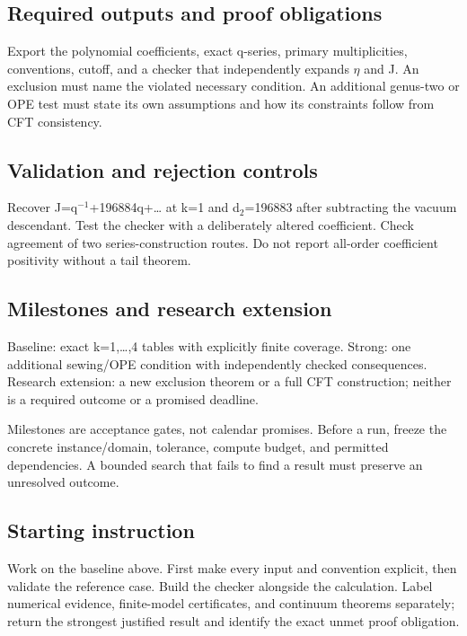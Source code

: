\documentclass[
  11pt,
]{article}
\begin{document}
\subsection{Required outputs and proof obligations}

Export the polynomial coefficients, exact q-series, primary
multiplicities, conventions, cutoff, and a checker that independently
expands \ensuremath{\eta} and J. An exclusion must name the violated
necessary condition. An additional genus-two or OPE test must state its
own assumptions and how its constraints follow from CFT consistency.

\subsection{Validation and rejection controls}

Recover J=q\ensuremath{{}^{-1}}+196884q+… at k=1 and
d\ensuremath{{}_{2}}=196883 after subtracting the vacuum descendant.
Test the checker with a deliberately altered coefficient. Check
agreement of two series-construction routes. Do not report all-order
coefficient positivity without a tail theorem.

\subsection{Milestones and research extension}

Baseline: exact k=1,\ldots,4 tables with explicitly finite coverage.
Strong: one additional sewing/OPE condition with independently checked
consequences. Research extension: a new exclusion theorem or a full CFT
construction; neither is a required outcome or a promised deadline.

Milestones are acceptance gates, not calendar promises. Before a run,
freeze the concrete instance/domain, tolerance, compute budget, and
permitted dependencies. A bounded search that fails to find a result
must preserve an unresolved outcome.

\subsection{Starting instruction}

Work on the baseline above. First make every input and convention
explicit, then validate the reference case. Build the checker alongside
the calculation. Label numerical evidence, finite-model certificates,
and continuum theorems separately; return the strongest justified result
and identify the exact unmet proof obligation.
\end{document}
